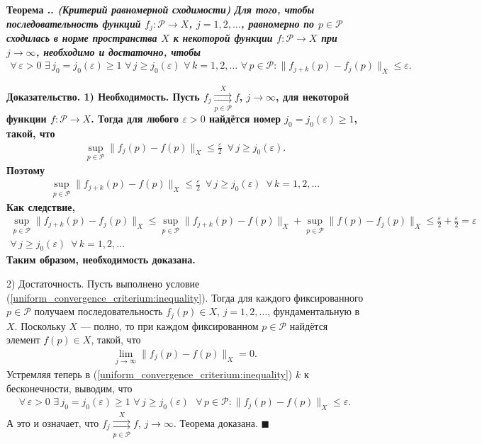 \documentclass{report}
\newcounter{rem}[section]
\newcounter{theor}[section]
\renewcommand{\thetheor}{\thesection.\arabic{theor}}
\newenvironment{Theorem}{\par\refstepcounter{theor}\bf Теорема \thetheor. \it}{\rm\par}
\newenvironment{Proof}{\par\noindent\bf Доказательство.\rm}{ $\blacksquare$\par}
\begin{document}
\begin{Theorem}\label{uniform_convergence_criterium} (Критерий равномерной сходимости) Для того, чтобы последовательность функций $f_j\colon\mathcal{P}\to X$, $j=1,2,\dots$, равномерно по
$p\in\mathcal{P}$ сходилась в норме пространства $X$ к некоторой функции $f\colon\mathcal{P}\to X$ при $j\to\infty$, необходимо и достаточно, чтобы
\begin{gather}\label{uniform_convergence_criterium:inequality}
\forall\,\varepsilon>0\,\,\exists\,j_0=j_0(\varepsilon)\geqslant1\,\,\forall\,j\geqslant j_0(\varepsilon)\,\,\forall\,k=1,2,\dots\,\,\forall\,p\in\mathcal{P}:\|f_{j+k}(p)-f_j(p)\|_X
\leqslant\varepsilon.
\end{gather}
\end{Theorem}
\begin{Proof}
1) Необходимость. Пусть $f_j\mathop{\rightrightarrows}\limits^{X}_{p\in\mathcal{P}}f$, $j\to\infty$, для некоторой функции $f\colon\mathcal{P}\to X$. Тогда для любого $\varepsilon>0$
найдётся номер $j_0=j_0(\varepsilon)\geqslant1$, такой, что
\begin{gather*}
\sup\limits_{p\in\mathcal{P}}\|f_j(p)-f(p)\|_X\leqslant\frac\varepsilon2\,\,\,\forall\,j\geqslant j_0(\varepsilon).
\end{gather*}
Поэтому
\begin{gather*}
\sup\limits_{p\in\mathcal{P}}\|f_{j+k}(p)-f(p)\|_X\leqslant\frac\varepsilon2\,\,\,\forall\,j\geqslant j_0(\varepsilon)\,\,\,\forall\,k=1,2,\dots
\end{gather*}
Как следствие,
\begin{gather*}
\sup\limits_{p\in\mathcal{P}}\|f_{j+k}(p)-f_j(p)\|_X\leqslant\sup\limits_{p\in\mathcal{P}}\|f_{j+k}(p)-f(p)\|_X+
\sup\limits_{p\in\mathcal{P}}\|f(p)-f_j(p)\|_X\leqslant\frac\varepsilon2+\frac\varepsilon2=\varepsilon\\
\forall\,j\geqslant j_0(\varepsilon)\,\,\,\forall\,k=1,2,\dots
\end{gather*}
Таким образом, необходимость доказана.

2) Достаточность. Пусть выполнено условие (\ref{uniform_convergence_criterium:inequality}). Тогда для каждого фиксированного $p\in\mathcal{P}$ получаем последовательность $f_j(p)\in X$,
$j=1,2,\dots$, фундаментальную в $X$. Поскольку $X$ --- полно, то при каждом фиксированном $p\in\mathcal{P}$ найдётся элемент $f(p)\in X$, такой, что
\begin{gather*}
\lim\limits_{j\to\infty}\|f_j(p)-f(p)\|_X=0.
\end{gather*}
Устремляя теперь в (\ref{uniform_convergence_criterium:inequality}) $k$ к бесконечности, выводим, что
\begin{gather*}
\forall\,\varepsilon>0\,\,\exists\,j_0=j_0(\varepsilon)\geqslant1\,\,\forall\,j\geqslant j_0(\varepsilon)\,\,\,\,\forall\,p\in\mathcal{P}:\|f_j(p)-f(p)\|_X\leqslant\varepsilon.
\end{gather*}
А это и означает, что $f_j\mathop{\rightrightarrows}\limits^{X}_{p\in\mathcal{P}}f$, $j\to\infty$. Теорема доказана.
\end{Proof}
\end{document}
